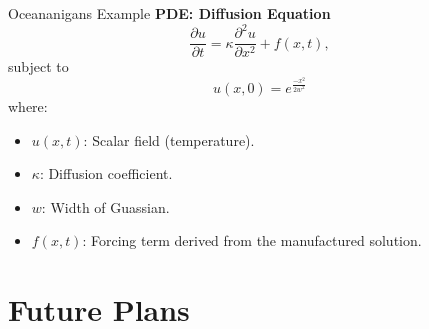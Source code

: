 \documentclass{beamer}
\begin{document}
\begin{frame}{Oceananigans Example}
    \textbf{PDE: Diffusion Equation}
    \begin{equation*}
        \frac{\partial u}{\partial t} = \kappa \frac{\partial^2 u}{\partial x^2} + f(x, t),
    \end{equation*}
    subject to
    \begin{equation*}
        u(x,0) = e^{\frac{-x^2}{2w^2}}
    \end{equation*}
    where:
    \begin{itemize}
        \item \( u(x, t) \): Scalar field (temperature).
        \item \( \kappa \): Diffusion coefficient.
        \item \( w \): Width of Guassian.
        \item \( f(x, t) \): Forcing term derived from the manufactured solution.
    \end{itemize}
\end{frame}


\section{Future Plans}
\end{document}
